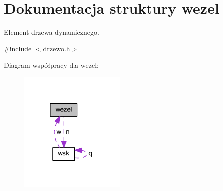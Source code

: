 \hypertarget{structwezel}{}\section{Dokumentacja struktury wezel}
\label{structwezel}


Element drzewa dynamicznego.  




{\ttfamily \#include $<$drzewo.\+h$>$}



Diagram współpracy dla wezel\+:\nopagebreak
\begin{figure}[H]
\begin{center}
\leavevmode
\includegraphics[width=145pt]{structwezel__coll__graph}
\end{center}
\end{figure}
